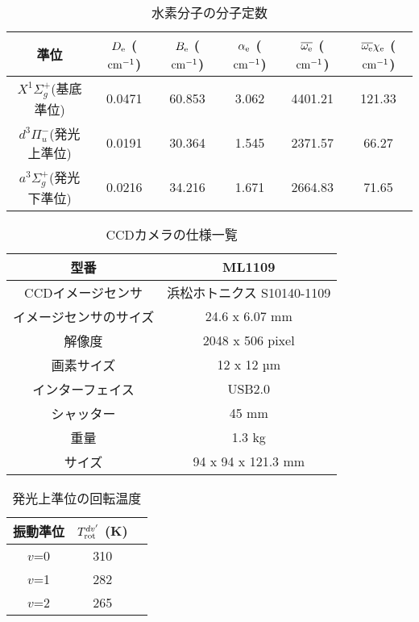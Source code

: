 \listoftables
{}

\begin{table}
    \caption{水素分子の分子定数\cite{nist}}
    \label{table:molecular-constants}
    \centering
    \begin{tabular}{cccccc}
        \hline
        準位 & $D_{\rm e}$ ($\rm cm^{-1}$)& $B_{\rm e}$ ($\rm cm^{-1}$)& $\alpha_{\rm e}$ ($\rm cm^{-1}$)& $\overline{\omega_{\rm e}}$ ($\rm cm^{-1}$)& $\overline{\omega_{\rm e}} \chi_{\rm e}$ ($\rm cm^{-1}$)\\
        \hline
        $X^1 \Sigma^+_g$(基底準位) & 0.0471 & 60.853 & 3.062 & 4401.21 & 121.33\\
        $d^3 \Pi^-_u$(発光上準位) & 0.0191 & 30.364 & 1.545 & 2371.57 & 66.27\\
        $a^3 \Sigma^+_g$(発光下準位) & 0.0216 & 34.216 & 1.671 & 2664.83 & 71.65\\
        \hline
    \end{tabular}
\end{table}

\begin{table}
    \caption{CCDカメラの仕様一覧\cite{CCD-spec}}
    \label{table:CCD-spec}
    \centering
    \begin{tabular}{|c|c|}
        \hline
        型番 & ML1109\\
        \hline
        CCDイメージセンサ & 浜松ホトニクス S10140-1109\\
        \hline
        イメージセンサのサイズ &24.6 x 6.07 mm\\
        \hline
        解像度 & 2048 x 506 pixel\\
        \hline
        画素サイズ & 12 x 12 µm\\
        \hline
        インターフェイス & USB2.0\\
        \hline
        シャッター & 45 mm\\
        \hline
        重量 & 1.3 kg\\
        \hline
        サイズ & 94 x 94 x 121.3 mm\\
        \hline
    \end{tabular}
\end{table}

\begin{table}
    \caption{発光上準位の回転温度}
    \label{table:upper-temperatures}
    \centering
    \begin{tabular}{ccc}
        \hline
        振動準位 & $T^{dv'}_{\rm rot}$ (K)\\
        \hline
        $v$=0 & 310\\
        $v$=1 & 282\\
        $v$=2 & 265\\
        \hline
    \end{tabular}
\end{table}

